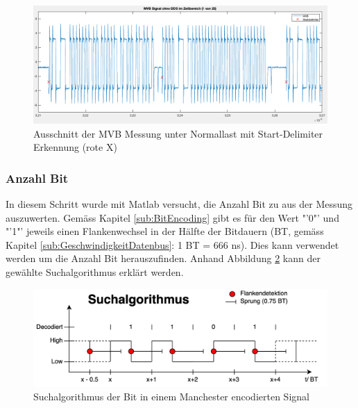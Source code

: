 \begin{figure}[H]
    \centering
    \includegraphics[width=0.8\linewidth]{Figures/Chap3/Busauslastung/Ausschnitt_MVB_mit_Delimiter.png}
    \caption{Ausschnitt der MVB Messung unter Normallast mit
Start-Delimiter Erkennung (rote X)}
    \label{fig:enter-label}
\end{figure}


\subsubsection{Anzahl Bit}
\label{subsub:Nulldurchgänge}
In diesem Schritt wurde mit Matlab versucht, die Anzahl Bit zu aus der Messung auszuwerten. Gemäss Kapitel \ref{sub:BitEncoding} gibt es für den Wert "'0"' und "'1"' jeweils einen Flankenwechsel in der Hälfte der Bitdauern (BT, gemäss Kapitel \ref{sub:GeschwindigkeitDatenbus}: 1 BT = 666 ns). Dies kann verwendet werden um die Anzahl Bit herauszufinden. Anhand Abbildung \ref{fig:Suchalgo_Bits} kann der gewählte Suchalgorithmus erklärt werden.

\begin{figure}[H]
    \centering
    \includegraphics[width=0.9\linewidth]{Figures/Chap3/Busauslastung/Suchalgorithmus_Bits.png}
    \caption{Suchalgorithmus der Bit in einem Manchester encodierten Signal}
    \label{fig:Suchalgo_Bits}
\end{figure}

